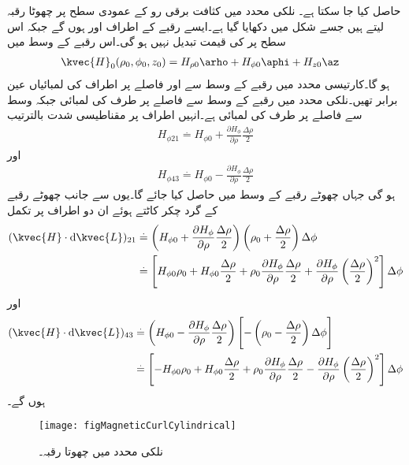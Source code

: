 حاصل کیا جا سکتا ہے۔
نلکی محدد میں  کثافت برقی رو کے عمودی سطح پر چھوٹا رقبہ لیتے ہیں جسے شکل  میں دکھایا گیا ہے۔ایسے رقبے کے اطراف  اور  ہوں گے جبکہ اس سطح پر  کی قیمت تبدیل نہیں ہو گی۔اس رقبے کے وسط میں
\begin{align*}
\kvec{H}_0(\rho_0,\phi_0,z_0)&=H_{\rho 0}\arho+H_{\phi 0}\aphi+H_{z 0}\az
\end{align*}
ہو گا۔کارتیسی محدد میں رقبے کے وسط سے  اور  فاصلے پر اطراف کی لمبائیاں عین برابر تھیں۔نلکی محدد میں رقبے کے وسط سے  فاصلے پر طرف کی لمبائی  جبکہ  وسط سے  فاصلے پر طرف کی لمبائی  ہے۔انہیں اطراف پر مقناطیسی شدت  بالترتیب
\begin{align*}
H_{\phi 21}\overset{.}{=}H_{\phi 0}+\frac{\partial H_\phi}{\partial \rho}\frac{\Delta \rho}{2}
\end{align*}
اور
\begin{align*}
H_{\phi 43}\overset{.}{=}H_{\phi 0}-\frac{\partial H_\phi}{\partial \rho}\frac{\Delta \rho}{2}
\end{align*}
ہو گی جہاں  چھوٹے رقبے کے وسط میں حاصل کیا جائے گا۔یوں  سے  جانب چھوٹے رقبے کے گرد چکر کاٹتے ہوئے ان دو اطراف پر تکمل
\begin{align*}
(\kvec{H} \cdot \dif \kvec{L})_{21}&\overset{.}{=}\left(H_{\phi 0}+\frac{\partial H_\phi}{\partial \rho}\frac{\Delta \rho}{2} \right)\left(\rho_0 +\frac{\Delta \rho}{2} \right)\Delta \phi\\
&\overset{.}{=}\left[H_{\phi 0} \rho_0+H_{\phi 0} \frac{\Delta \rho}{2}+\rho_0 \frac{\partial H_\phi}{\partial \rho}\frac{\Delta \rho}{2}+\frac{\partial H_\phi}{\partial \rho} \left(\frac{\Delta \rho}{2} \right)^2\right]\Delta \phi
\end{align*}
اور
\begin{align*}
(\kvec{H} \cdot \dif \kvec{L})_{43}&\overset{.}{=}\left(H_{\phi 0}-\frac{\partial H_\phi}{\partial \rho}\frac{\Delta \rho}{2} \right)\left[-\left(\rho_0 -\frac{\Delta \rho}{2} \right)\Delta \phi\right]\\
&\overset{.}{=}\left[-H_{\phi 0} \rho_0+H_{\phi 0} \frac{\Delta \rho}{2}+\rho_0 \frac{\partial H_\phi}{\partial \rho}\frac{\Delta \rho}{2}-\frac{\partial H_\phi}{\partial \rho} \left(\frac{\Delta \rho}{2} \right)^2\right]\Delta \phi
\end{align*}
ہوں گے۔
\begin{figure}
\centering
\texttt{[image: figMagneticCurlCylindrical]}
\caption{نلکی محدد میں چھوتا رقبہ۔}
\label{شکل_مقناطیسی_نلکی_شدت_رقبہ}
\end{figure}

